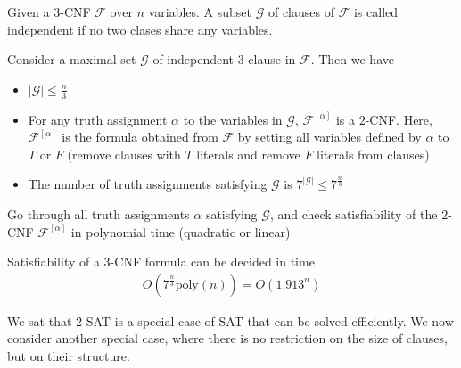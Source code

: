 \documentclass[a4paper]{article}
\theoremstyle{plain}
\newtheorem{thm}{Theorem}[section]
\newtheorem{lem}[thm]{Lemma}
\theoremstyle{definition}
\newtheorem{defn}{Definition}[section]
\theoremstyle{remark}
\begin{document}
\begin{tcolorbox}[colback=black!3!white,colframe=black!60!white,title=\begin{defn}Independency \label{Independency}\end{defn}]
Given a $3$-CNF $\mathcal{F}$ over $n$ variables. A subset $\mathcal{G}$ of clauses of $\mathcal{F}$ is called independent if no two clases share any variables.
\end{tcolorbox}
\begin{tcolorbox}[colback=black!3!white,colframe=black!60!white,title=\begin{lem}Maximal Set and 3-SAT \label{Maximal Set and 3-SAT}\end{lem}]
        Consider a maximal set $\mathcal{G}$ of independent $3$-clause in $\mathcal{F}$. Then we have
	\begin{itemize}
		\item $|\mathcal{G}| \le \frac{n}{3}$
		\item For any truth assignment $\alpha$ to the variables in $\mathcal{G}$, $\mathcal{F}^{[\alpha]}$ is a $2$-CNF. Here, $\mathcal{F}^{[\alpha]}$ is the formula obtained from $\mathcal{F}$ by setting all variables defined by $\alpha$ to $T$ or $F$ (remove clauses with $T$ literals and remove $F$ literals from clauses)
		\item The number of truth assignments satisfying $\mathcal{G}$ is $7^{|\mathcal{G}|}\le 7^{\frac{n}{3}}$
	\end{itemize}
\end{tcolorbox}
\begin{tcolorbox}[colback=black!3!white,colframe=black!60!white,title=\begin{defn}3-SAT Algorithm \label{3-SAT Algorithm}\end{defn}]
Go through all truth assignments $\alpha$ satisfying $\mathcal{G}$, and check satisfiability of the $2$-CNF $\mathcal{F}^{[\alpha]}$ in polynomial time (quadratic or linear)
\end{tcolorbox}
\begin{tcolorbox}[colback=black!3!white,colframe=black!60!white,title=\begin{thm}3-CNF Runtime \label{3-CNF Runtime}\end{thm}]
	Satisfiability of a $3$-CNF formula can be decided in time
		\begin{align}
		O(7^{\frac{n}{3}}\text{poly}(n)) = O(1.913^{n})
		\end{align}
\end{tcolorbox}
\begin{tcolorbox}[colback=black!3!white,colframe=black!60!white,title=\begin{defn}Horn Satisfiability \label{Horn Satisfiability}\end{defn}]
We sat that $2$-SAT is a special case of SAT that can be solved efficiently. We now consider another special case, where there is no restriction on the size of clauses, but on their structure.
\end{tcolorbox}
\end{document}
